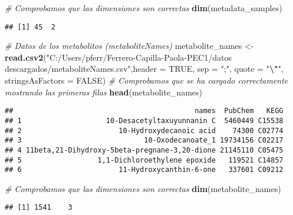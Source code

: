 \documentclass[
]{article}
\newenvironment{Shaded}{\begin{snugshade}}{\end{snugshade}}
\newcommand{\AttributeTok}[1]{\textcolor[rgb]{0.13,0.29,0.53}{#1}}
\newcommand{\CommentTok}[1]{\textcolor[rgb]{0.56,0.35,0.01}{\textit{#1}}}
\newcommand{\ConstantTok}[1]{\textcolor[rgb]{0.56,0.35,0.01}{#1}}
\newcommand{\FunctionTok}[1]{\textcolor[rgb]{0.13,0.29,0.53}{\textbf{#1}}}
\newcommand{\NormalTok}[1]{#1}
\newcommand{\OtherTok}[1]{\textcolor[rgb]{0.56,0.35,0.01}{#1}}
\newcommand{\SpecialCharTok}[1]{\textcolor[rgb]{0.81,0.36,0.00}{\textbf{#1}}}
\newcommand{\StringTok}[1]{\textcolor[rgb]{0.31,0.60,0.02}{#1}}
\begin{document}
\begin{Shaded}
\begin{Highlighting}[]
\CommentTok{\# Comprobamos que las dimensiones son correctas}
\FunctionTok{dim}\NormalTok{(metadata\_samples)}
\end{Highlighting}
\end{Shaded}

\begin{verbatim}
## [1] 45  2
\end{verbatim}

\begin{Shaded}
\begin{Highlighting}[]
\CommentTok{\# Datos de los metabolitos (metaboliteNames)}
\NormalTok{metabolite\_names }\OtherTok{\textless{}{-}} \FunctionTok{read.csv2}\NormalTok{(}\StringTok{"C:/Users/pferr/Ferrero{-}Capilla{-}Paola{-}PEC1/datos descargados/metaboliteNames.csv"}\NormalTok{,}\AttributeTok{header =} \ConstantTok{TRUE}\NormalTok{, }\AttributeTok{sep =} \StringTok{";"}\NormalTok{, }\AttributeTok{quote =} \StringTok{"}\SpecialCharTok{\textbackslash{}"}\StringTok{"}\NormalTok{, }\AttributeTok{stringsAsFactors =} \ConstantTok{FALSE}\NormalTok{)}
\CommentTok{\# Comprobamos que se ha cargado correctamente mostrando las primeras filas}
\FunctionTok{head}\NormalTok{(metabolite\_names)}
\end{Highlighting}
\end{Shaded}

\begin{verbatim}
##                                           names  PubChem   KEGG
## 1                    10-Desacetyltaxuyunnanin C  5460449 C15538
## 2                       10-Hydroxydecanoic acid    74300 C02774
## 3                             10-Oxodecanoate_1 19734156 C02217
## 4 11beta,21-Dihydroxy-5beta-pregnane-3,20-dione 21145110 C05475
## 5                  1,1-Dichloroethylene epoxide   119521 C14857
## 6                       11-Hydroxycanthin-6-one   337601 C09212
\end{verbatim}

\begin{Shaded}
\begin{Highlighting}[]
\CommentTok{\# Comprobamos que las dimensiones son correctas}
\FunctionTok{dim}\NormalTok{(metabolite\_names)}
\end{Highlighting}
\end{Shaded}

\begin{verbatim}
## [1] 1541    3
\end{verbatim}
\end{document}
